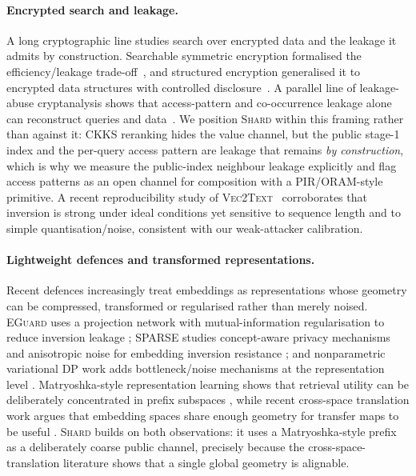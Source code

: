 \paragraph{Encrypted search and leakage.} A long cryptographic line studies
search over encrypted data and the leakage it admits by construction.
Searchable symmetric encryption formalised the efficiency/leakage
trade-off~\cite{ref_sse}, and structured encryption generalised it to
encrypted data structures with controlled disclosure~\cite{ref_structenc}.
A parallel line of leakage-abuse cryptanalysis shows that access-pattern and
co-occurrence leakage alone can reconstruct queries and
data~\cite{ref_leakageabuse,ref_accesspattern}. We position \textsc{Shard}
within this framing rather than against it: CKKS reranking hides the value
channel, but the public stage-1 index and the per-query access pattern are
leakage that remains \emph{by construction}, which is why we measure the
public-index neighbour leakage explicitly and flag access patterns as an
open channel for composition with a PIR/ORAM-style primitive. A recent
reproducibility study of \textsc{Vec2Text}~\cite{ref_v2t_repro} corroborates
that inversion is strong under ideal conditions yet sensitive to sequence
length and to simple quantisation/noise, consistent with our weak-attacker
calibration.

\paragraph{Lightweight defences and transformed representations.}
Recent defences increasingly treat embeddings as representations whose
geometry can be compressed, transformed or regularised rather than merely
noised. \textsc{EGuard} uses a projection network with mutual-information
regularisation to reduce inversion leakage \cite{ref_eguard};
\textsc{SPARSE} studies concept-aware privacy mechanisms and anisotropic
noise for embedding inversion resistance \cite{ref_sparse}; and
nonparametric variational DP work adds bottleneck/noise mechanisms at
the representation level \cite{ref_nvdp}. Matryoshka-style representation
learning shows that retrieval utility can be deliberately concentrated in
prefix subspaces \cite{ref_mrl}, while recent cross-space translation
work argues that embedding spaces share enough geometry for transfer
maps to be useful \cite{ref_vec2vec}. \textsc{Shard} builds on both
observations: it uses a Matryoshka-style prefix as a deliberately coarse
public channel, precisely because the cross-space-translation literature
shows that a single global geometry is alignable.

